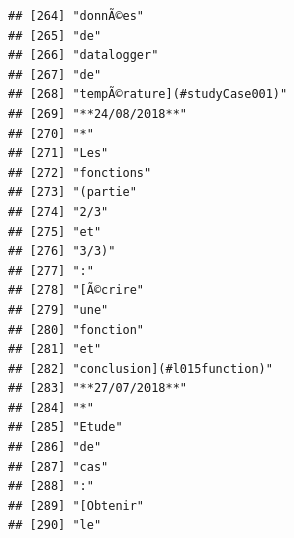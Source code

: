 \documentclass[]{book}
\begin{document}
\begin{verbatim}
## [264] "donnÃ©es"                                                                               
## [265] "de"                                                                                     
## [266] "datalogger"                                                                             
## [267] "de"                                                                                     
## [268] "tempÃ©rature](#studyCase001)"                                                           
## [269] "**24/08/2018**"                                                                         
## [270] "*"                                                                                      
## [271] "Les"                                                                                    
## [272] "fonctions"                                                                              
## [273] "(partie"                                                                                
## [274] "2/3"                                                                                    
## [275] "et"                                                                                     
## [276] "3/3)"                                                                                   
## [277] ":"                                                                                      
## [278] "[Ã©crire"                                                                               
## [279] "une"                                                                                    
## [280] "fonction"                                                                               
## [281] "et"                                                                                     
## [282] "conclusion](#l015function)"                                                             
## [283] "**27/07/2018**"                                                                         
## [284] "*"                                                                                      
## [285] "Etude"                                                                                  
## [286] "de"                                                                                     
## [287] "cas"                                                                                    
## [288] ":"                                                                                      
## [289] "[Obtenir"                                                                               
## [290] "le"                                                                                     

\end{verbatim}
\end{document}
